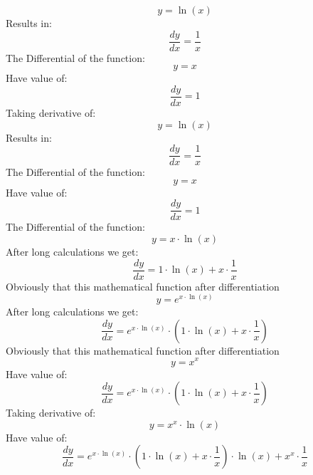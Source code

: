 \documentclass{article}
\begin{document}
\begin{center}
\begin{dmath}
 y = \ln (x)
\end{dmath}
Results in:
\begin{dmath}
 \frac{dy}{dx} = \dfrac{1}{x}
\end{dmath}
The Differential of the function:
\begin{dmath}
 y = x
\end{dmath}
Have value of:
\begin{dmath}
 \frac{dy}{dx} = 1
\end{dmath}
Taking derivative of:
\begin{dmath}
 y = \ln (x)
\end{dmath}
Results in:
\begin{dmath}
 \frac{dy}{dx} = \dfrac{1}{x}
\end{dmath}
The Differential of the function:
\begin{dmath}
 y = x
\end{dmath}
Have value of:
\begin{dmath}
 \frac{dy}{dx} = 1
\end{dmath}
The Differential of the function:
\begin{dmath}
 y = x\cdot \ln (x)
\end{dmath}
After long calculations we get:
\begin{dmath}
 \frac{dy}{dx} = 1\cdot \ln (x)+x\cdot \dfrac{1}{x}
\end{dmath}
Obviously that this mathematical function after differentiation
\begin{dmath}
 y = e^{x\cdot \ln (x)}
\end{dmath}
After long calculations we get:
\begin{dmath}
 \frac{dy}{dx} = e^{x\cdot \ln (x)}\cdot (1\cdot \ln (x)+x\cdot \dfrac{1}{x})
\end{dmath}
Obviously that this mathematical function after differentiation
\begin{dmath}
 y = x^{x}
\end{dmath}
Have value of:
\begin{dmath}
 \frac{dy}{dx} = e^{x\cdot \ln (x)}\cdot (1\cdot \ln (x)+x\cdot \dfrac{1}{x})
\end{dmath}
Taking derivative of:
\begin{dmath}
 y = x^{x}\cdot \ln (x)
\end{dmath}
Have value of:
\begin{dmath}
 \frac{dy}{dx} = e^{x\cdot \ln (x)}\cdot (1\cdot \ln (x)+x\cdot \dfrac{1}{x})\cdot \ln (x)+x^{x}\cdot \dfrac{1}{x}
\end{dmath}

\end{center}
\end{document}
